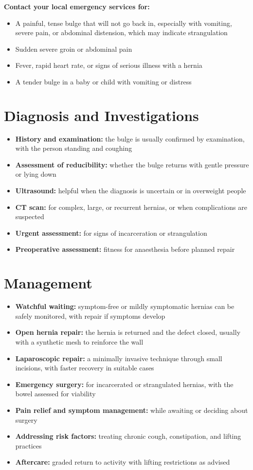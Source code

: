 \textbf{Contact your local emergency services for:}
\begin{itemize}
    \item A painful, tense bulge that will not go back in, especially with vomiting, severe pain, or abdominal distension, which may indicate strangulation
    \item Sudden severe groin or abdominal pain
    \item Fever, rapid heart rate, or signs of serious illness with a hernia
    \item A tender bulge in a baby or child with vomiting or distress
\end{itemize}

\section*{Diagnosis and Investigations}
\begin{itemize}
    \item \textbf{History and examination:} the bulge is usually confirmed by examination, with the person standing and coughing
    \item \textbf{Assessment of reducibility:} whether the bulge returns with gentle pressure or lying down
    \item \textbf{Ultrasound:} helpful when the diagnosis is uncertain or in overweight people
    \item \textbf{CT scan:} for complex, large, or recurrent hernias, or when complications are suspected
    \item \textbf{Urgent assessment:} for signs of incarceration or strangulation
    \item \textbf{Preoperative assessment:} fitness for anaesthesia before planned repair
\end{itemize}

\section*{Management}
\begin{itemize}
    \item \textbf{Watchful waiting:} symptom-free or mildly symptomatic hernias can be safely monitored, with repair if symptoms develop
    \item \textbf{Open hernia repair:} the hernia is returned and the defect closed, usually with a synthetic mesh to reinforce the wall
    \item \textbf{Laparoscopic repair:} a minimally invasive technique through small incisions, with faster recovery in suitable cases
    \item \textbf{Emergency surgery:} for incarcerated or strangulated hernias, with the bowel assessed for viability
    \item \textbf{Pain relief and symptom management:} while awaiting or deciding about surgery
    \item \textbf{Addressing risk factors:} treating chronic cough, constipation, and lifting practices
    \item \textbf{Aftercare:} graded return to activity with lifting restrictions as advised
\end{itemize}

